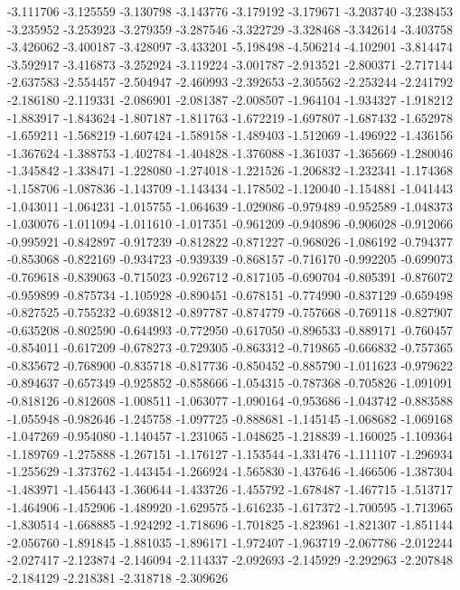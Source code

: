 -3.111706
-3.125559
-3.130798
-3.143776
-3.179192
-3.179671
-3.203740
-3.238453
-3.235952
-3.253923
-3.279359
-3.287546
-3.322729
-3.328468
-3.342614
-3.403758
-3.426062
-3.400187
-3.428097
-3.433201
-5.198498
-4.506214
-4.102901
-3.814474
-3.592917
-3.416873
-3.252924
-3.119224
-3.001787
-2.913521
-2.800371
-2.717144
-2.637583
-2.554457
-2.504947
-2.460993
-2.392653
-2.305562
-2.253244
-2.241792
-2.186180
-2.119331
-2.086901
-2.081387
-2.008507
-1.964104
-1.934327
-1.918212
-1.883917
-1.843624
-1.807187
-1.811763
-1.672219
-1.697807
-1.687432
-1.652978
-1.659211
-1.568219
-1.607424
-1.589158
-1.489403
-1.512069
-1.496922
-1.436156
-1.367624
-1.388753
-1.402784
-1.404828
-1.376088
-1.361037
-1.365669
-1.280046
-1.345842
-1.338471
-1.228080
-1.274018
-1.221526
-1.206832
-1.232341
-1.174368
-1.158706
-1.087836
-1.143709
-1.143434
-1.178502
-1.120040
-1.154881
-1.041443
-1.043011
-1.064231
-1.015755
-1.064639
-1.029086
-0.979489
-0.952589
-1.048373
-1.030076
-1.011094
-1.011610
-1.017351
-0.961209
-0.940896
-0.906028
-0.912066
-0.995921
-0.842897
-0.917239
-0.812822
-0.871227
-0.968026
-1.086192
-0.794377
-0.853068
-0.822169
-0.934723
-0.939339
-0.868157
-0.716170
-0.992205
-0.699073
-0.769618
-0.839063
-0.715023
-0.926712
-0.817105
-0.690704
-0.805391
-0.876072
-0.959899
-0.875734
-1.105928
-0.890451
-0.678151
-0.774990
-0.837129
-0.659498
-0.827525
-0.755232
-0.693812
-0.897787
-0.874779
-0.757668
-0.769118
-0.827907
-0.635208
-0.802590
-0.644993
-0.772950
-0.617050
-0.896533
-0.889171
-0.760457
-0.854011
-0.617209
-0.678273
-0.729305
-0.863312
-0.719865
-0.666832
-0.757365
-0.835672
-0.768900
-0.835718
-0.817736
-0.850452
-0.885790
-1.011623
-0.979622
-0.894637
-0.657349
-0.925852
-0.858666
-1.054315
-0.787368
-0.705826
-1.091091
-0.818126
-0.812608
-1.008511
-1.063077
-1.090164
-0.953686
-1.043742
-0.883588
-1.055948
-0.982646
-1.245758
-1.097725
-0.888681
-1.145145
-1.068682
-1.069168
-1.047269
-0.954080
-1.140457
-1.231065
-1.048625
-1.218839
-1.160025
-1.109364
-1.189769
-1.275888
-1.267151
-1.176127
-1.153544
-1.331476
-1.111107
-1.296934
-1.255629
-1.373762
-1.443454
-1.266924
-1.565830
-1.437646
-1.466506
-1.387304
-1.483971
-1.456443
-1.360644
-1.433726
-1.455792
-1.678487
-1.467715
-1.513717
-1.464906
-1.452906
-1.489920
-1.629575
-1.616235
-1.617372
-1.700595
-1.713965
-1.830514
-1.668885
-1.924292
-1.718696
-1.701825
-1.823961
-1.821307
-1.851144
-2.056760
-1.891845
-1.881035
-1.896171
-1.972407
-1.963719
-2.067786
-2.012244
-2.027417
-2.123874
-2.146094
-2.114337
-2.092693
-2.145929
-2.292963
-2.207848
-2.184129
-2.218381
-2.318718
-2.309626
